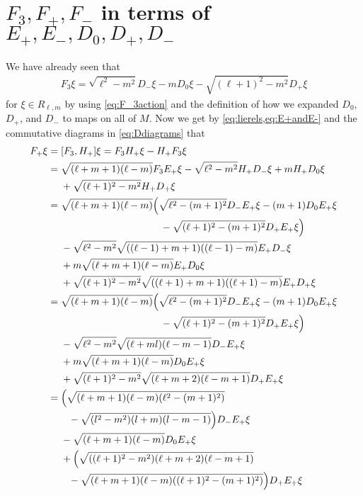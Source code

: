 \section{\texorpdfstring{$F_3,F_+,F_-$ in terms of $E_+,E_-,D_0,D_+,D_-$}{F\_3,F\_+,F\_- in terms of E\_+,E\_-,D\_0,D\_+,D\_-}}\label{sec:Factions}

We have already seen that
\begin{align*}
  F_3 \xi = \sqrt{\ell^2-m^2} D_- \xi - m D_0 \xi - \sqrt{(\ell+1)^2-m^2} D_+ \xi
\end{align*}
for $\xi\in R_{\ell,m}$ by using \cref{eq:F_3action} and the definition of how we expanded $D_0$, $D_+$, and $D_-$ to maps on all of $M$. Now we get by \cref{eq:lierels,eq:E+andE-} and the commutative diagrams in \cref{eq:Ddiagrams} that
\begin{align*}
  F_+ \xi &= [F_3,H_+] \xi = F_3H_+ \xi - H_+F_3 \xi \\
          &= \sqrt{(\ell+m+1)(\ell-m)}F_3E_+ \xi - \sqrt{\ell^2-m^2} H_+D_- \xi + m H_+D_0 \xi \\*
          &\phantom{{}={}}{} + \sqrt{(\ell+1)^2-m^2} H_+D_+ \xi \\
          &= \sqrt{(\ell+m+1)(\ell-m)}\Bigl( \sqrt{\ell^2-(m+1)^2} D_-E_+ \xi - (m+1) D_0E_+ \xi \\*
          &\phantom{{}={}\sqrt{(\ell+m+1)(\ell-m)}()}{} - \sqrt{(\ell+1)^2-(m+1)^2} D_+E_+ \xi \Bigr) \\*
          &\phantom{{}={}}{} - \sqrt{\ell^2-m^2} \sqrt{((\ell-1)+m+1)((\ell-1)-m)} E_+D_- \xi \\*
          &\phantom{{}={}}{} + m \sqrt{(\ell+m+1)(\ell-m)}E_+D_0 \xi \\*
          &\phantom{{}={}}{} + \sqrt{(\ell+1)^2-m^2}\sqrt{((\ell+1)+m+1)((\ell+1)-m)} E_+D_+ \xi \\
          &= \sqrt{(\ell+m+1)(\ell-m)}\Bigl( \sqrt{\ell^2-(m+1)^2} D_-E_+ \xi - (m+1) D_0E_+ \xi \\*
          &\phantom{{}={}\sqrt{(\ell+m+1)(\ell-m)}()}{} - \sqrt{(\ell+1)^2-(m+1)^2} D_+E_+ \xi \Bigr) \\*
          &\phantom{{}={}}{} - \sqrt{\ell^2-m^2} \sqrt{(\ell+ml)(\ell-m-1)} D_-E_+ \xi \\*
          &\phantom{{}={}}{} + m \sqrt{(\ell+m+1)(\ell-m)}D_0E_+ \xi \\*
          &\phantom{{}={}}{} + \sqrt{(\ell+1)^2-m^2}\sqrt{(\ell+m+2)(\ell-m+1)} D_+E_+ \xi \\
          &= \Bigl( \sqrt{(\ell+m+1)(\ell-m)(\ell^2-(m+1)^2)} \\*
          &\phantom{{}={}()}{} - \sqrt{(l^2-m^2)(l+m)(l-m-1)} \Bigr)D_-E_+ \xi \\*
          &\phantom{{}={}}{} - \sqrt{(\ell+m+1)(\ell-m)}D_0E_+\xi \\*
          &\phantom{{}={}}{} + \Bigl( \sqrt{((\ell+1)^2-m^2)(\ell+m+2)(\ell-m+1)} \\*
          &\phantom{{}={}()}{} - \sqrt{(\ell+m+1)(\ell-m)((\ell+1)^2-(m+1)^2)}\Bigr)D_+E_+\xi
\end{align*}
